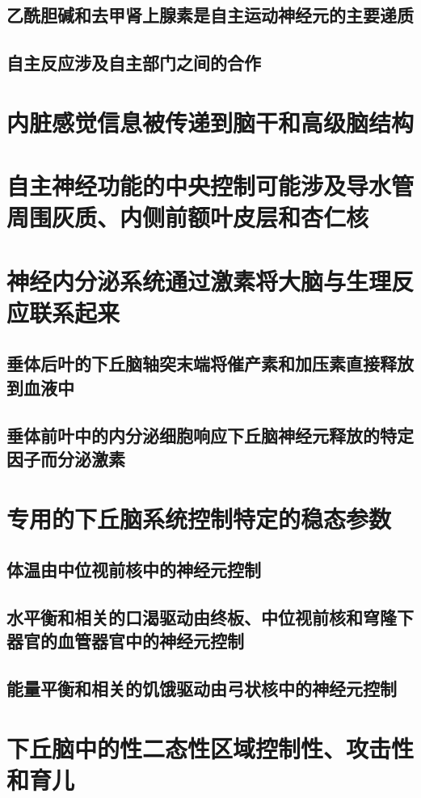 \subsection{乙酰胆碱和去甲肾上腺素是自主运动神经元的主要递质}
\subsection{自主反应涉及自主部门之间的合作}

\section{内脏感觉信息被传递到脑干和高级脑结构}
\section{自主神经功能的中央控制可能涉及导水管周围灰质、内侧前额叶皮层和杏仁核}

\section{神经内分泌系统通过激素将大脑与生理反应联系起来}
\subsection{垂体后叶的下丘脑轴突末端将催产素和加压素直接释放到血液中}
\subsection{垂体前叶中的内分泌细胞响应下丘脑神经元释放的特定因子而分泌激素}

\section{专用的下丘脑系统控制特定的稳态参数}
\subsection{体温由中位视前核中的神经元控制}
\subsection{水平衡和相关的口渴驱动由终板、中位视前核和穹隆下器官的血管器官中的神经元控制}
\subsection{能量平衡和相关的饥饿驱动由弓状核中的神经元控制}

\section{下丘脑中的性二态性区域控制性、攻击性和育儿}
